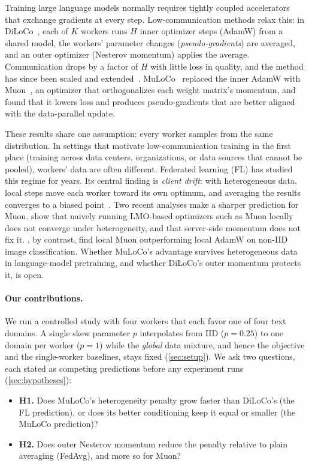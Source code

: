 \documentclass{article}
\begin{document}
Training large language models normally requires tightly coupled accelerators that exchange gradients at every step. Low-communication methods relax this: in DiLoCo~\cite{douillard2023diloco}, each of $K$ workers runs $H$ inner optimizer steps (AdamW) from a shared model, the workers' parameter changes (\emph{pseudo-gradients}) are averaged, and an outer optimizer (Nesterov momentum) applies the average. Communication drops by a factor of $H$ with little loss in quality, and the method has since been scaled and extended~\cite{jaghouar2024opendiloco,douillard2025streaming,charles2025scaling}. MuLoCo~\cite{therien2025muloco} replaced the inner AdamW with Muon~\cite{jordan2024muon}, an optimizer that orthogonalizes each weight matrix's momentum, and found that it lowers loss and produces pseudo-gradients that are better aligned with the data-parallel update.

These results share one assumption: every worker samples from the same distribution. In settings that motivate low-communication training in the first place (training across data centers, organizations, or data sources that
cannot be pooled), workers' data are often different. Federated learning (FL) has studied this regime for years. Its central finding is \emph{client drift}: with heterogeneous data, local steps move each worker toward its own optimum, and averaging the results converges to a biased point~\cite{zhao2018noniid,karimireddy2020scaffold,wang2020fednova}. Two recent analyses make a sharper prediction for Muon. \citet{takezawa2026fedmuon} show that naively running LMO-based optimizers such as Muon locally does not converge under heterogeneity, and that server-side momentum does not fix it. \citet{liu2025fedmuon}, by contrast, find local Muon outperforming local AdamW on non-IID image classification. Whether MuLoCo's advantage survives heterogeneous data in language-model pretraining, and whether DiLoCo's outer momentum protects it, is open.

\paragraph{Our contributions.} We run a controlled study with four workers that each favor one of four text domains. A single skew parameter $p$ interpolates from IID ($p=0.25$) to one domain per worker ($p=1$) while the \emph{global} data mixture, and hence the objective and the single-worker baselines, stays fixed (\cref{sec:setup}). We ask two questions, each stated as competing predictions before any experiment runs (\cref{sec:hypotheses}):
\begin{itemize}
  \item \textbf{H1.} Does MuLoCo's heterogeneity penalty grow faster than DiLoCo's (the FL prediction), or does its better conditioning keep it equal or smaller (the MuLoCo prediction)?
  \item \textbf{H2.} Does outer Nesterov momentum reduce the penalty relative to plain averaging (FedAvg), and more so for Muon?
\end{itemize}
\end{document}
